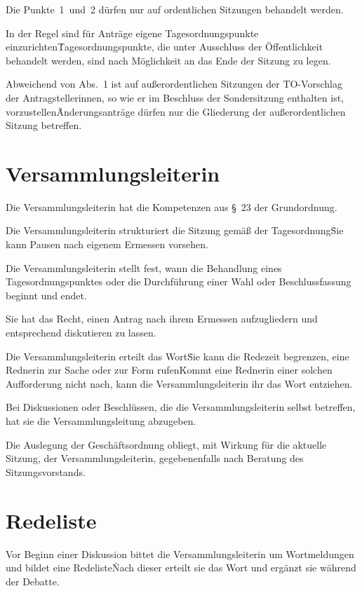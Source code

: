 \begin{multicols}{2}
\Satz Die Punkte~1~und~2 dürfen nur auf ordentlichen Sitzungen behandelt werden.

\Abs \Satz In der Regel sind für Anträge eigene Tagesordnungspunkte einzurichten\. Tages\-ordnungspunkte, die unter Ausschluss der Öffentlichkeit behandelt werden, sind nach Möglichkeit an das Ende der Sitzung zu legen.

\Abs \Satz Abweichend von Abs.~1 ist auf außerordentlichen Sitzungen der TO-Vorschlag der Antragstellerinnen, so wie er im Beschluss der Sondersitzung enthalten ist, vorzustellen\. Änderungsanträge dürfen nur die Gliederung der außerordentlichen Sitzung betreffen.



\section{Versammlungsleiterin}

\Abs \Satz Die Versammlungsleiterin hat die Kompetenzen aus §~23 der Grundordnung.

\Abs \Satz Die Versammlungsleiterin strukturiert die Sitzung gemäß der Tagesordnung\. Sie kann Pausen nach eigenem Ermessen vorsehen.

\Abs \Satz Die Versammlungsleiterin stellt fest, wann die Behandlung eines Tagesordnungspunktes oder die Durchführung einer Wahl oder Beschlussfassung beginnt und endet.

\Abs \Satz Sie hat das Recht, einen Antrag nach ihrem Ermessen aufzugliedern und entsprechend diskutieren zu lassen.

\Abs \Satz Die Versammlungsleiterin erteilt das Wort\. Sie kann die Redezeit begrenzen, eine Rednerin zur Sache oder zur Form rufen\. Kommt eine Rednerin einer solchen Aufforderung nicht nach, kann die Versammlungsleiterin ihr das Wort entziehen.

\Abs \Satz Bei Diskussionen oder Beschlüssen, die die Versammlungsleiterin selbst betreffen, hat sie die Versammlungsleitung abzugeben.

\Abs \Satz Die Auslegung der Geschäftsordnung obliegt, mit Wirkung für die aktuelle Sitzung, der Versammlungsleiterin, gegebenenfalls nach Beratung des Sitzungsvorstands.



\section{Redeliste}

\Abs \Satz Vor Beginn einer Diskussion bittet die Versammlungsleiterin um Wortmeldungen und bildet eine Redeliste\. Nach dieser erteilt sie das Wort und ergänzt sie während der Debatte.


\end{multicols}
